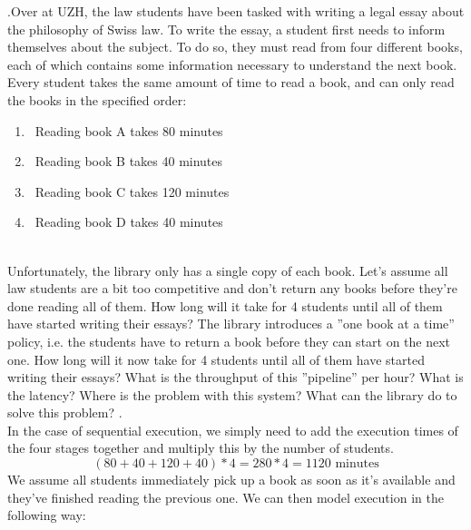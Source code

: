 \documentclass[main.tex]{subfiles}
\begin{document}
\begin{ExerciseList}
    \Exercise[title={Pipelining},label=pipe].\quad Over at UZH, the law students have been tasked with writing a legal essay about the philosophy of Swiss law. To write the essay, a student first needs to inform themselves about the subject. To do so, they must read from four different books, each of which contains some information necessary to understand the next book. \\[3mm]
    Every student takes the same amount of time to read a book, and can only read the books in the specified order:
    \begin{enumerate}[label=\arabic*)]
        \item\ Reading book A takes 80 minutes
        \item\ Reading book B takes 40 minutes
        \item\ Reading book C takes 120 minutes
        \item\ Reading book D takes 40 minutes
    \end{enumerate}\\
    Unfortunately, the library only has a single copy of each book.
        \Question Let's assume all law students are a bit too competitive and don't return any books before they're done reading all of them. How long will it take for 4 students until all of them have started writing their essays?
        \Question The library introduces a ''one book at a time'' policy, i.e. the students have to return a book before they can start on the next one. How long will it now take for 4 students until all of them have started writing their essays? What is the throughput of this ''pipeline'' per hour? What is the latency?
        \Question Where is the problem with this system? What can the library do to solve this problem?
    \Answer[ref={pipe}].\\
        \Question In the case of sequential execution, we simply need to add the execution times of the four stages together and multiply this by the number of students.
            \begin{equation*}
                (80 + 40 + 120 + 40) * 4 = 280 * 4  = 1120 \text{ minutes}
            \end{equation*}
        \Question We assume all students immediately pick up a book as soon as it's available and they've finished reading the previous one. We can then model execution in the following way: \\[3mm]
            \begin{small}
                \begin{tabular}{l | *{19}{c}}

\end{tabular}
\end{small}
\end{ExerciseList}
\end{document}
